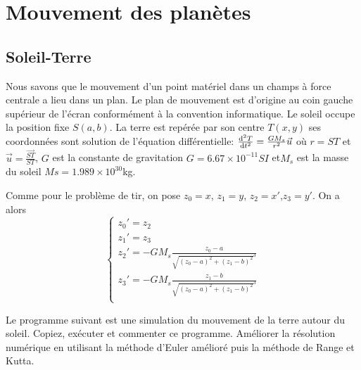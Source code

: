 \documentclass{article}
\def \de {{\rm d}}
\begin{document}
\section{Mouvement des planètes}  
\subsection{Soleil-Terre}
Nous savons que le mouvement d'un point matériel dans un champs à force centrale a lieu dans un plan. Le plan de mouvement est d'origine au coin gauche supérieur de l'écran conformément à la convention informatique. Le soleil occupe la position fixe $S(a,b)$. La terre est repérée par son centre $T(x,y)$ ses coordonnées sont solution de l'équation différentielle: $\frac{\de^2 T}{\de t^2}=\frac{GM_s}{r^2}\vec u$ où $r=ST$ et $\vec{u} =\frac{\overrightarrow{ST}}{ST}$, $G$ est la constante de gravitation $G=6.67\times 10^{-11} SI$ et$M_s$ est la masse du soleil $Ms=1.989\times 10^{30}$kg.
  \begin{center}
 \end{center}

Comme pour le problème de tir, on pose $z_0=x$, $z_1=y$, $z_2=x'$,$z_3=y'$. On a alors
  \[\left\{\begin{array}{l}
  z_0'=z_2\\
  z_1'=z_3\\
  z_2'=-GM_s\frac{z_0-a}{\sqrt{(z_0-a)^2+(z_1-b)^2}^3}\\
  z_3'=-GM_s\frac{z_1-b}{\sqrt{(z_0-a)^2+(z_1-b)^2}^3}\\
  \end{array}\right.\]
   
Le programme suivant est une simulation du mouvement de la terre autour du soleil. Copiez, exécuter et commenter ce programme. Améliorer la résolution numérique en utilisant la méthode d'Euler amélioré puis la méthode de Range et Kutta.
\end{document}
